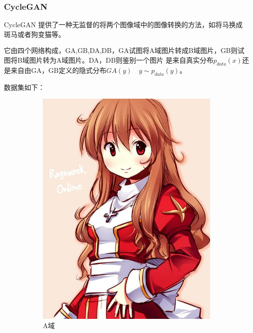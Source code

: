 \documentclass{beamer}
\begin{document}
\begin{frame}
\frametitle{CycleGAN}

CycleGAN \cite{zhu2017unpaired} 提供了一种无监督的将两个图像域中的图像转换的方法，如将马换成斑马或者狗变猫等。

它由四个网络构成，GA,GB,DA,DB，GA试图将A域图片转成B域图片，GB则试图将B域图片转为A域图片。DA，DB则鉴别一个图片
是来自真实分布$p_{data}(x)$还是来自由GA，GB定义的隐式分布$GA(y) \quad y \sim p_{data}(y)$。

数据集如下：

\begin{figure}[htb]
    \centering
    \begin{subfigure}[b]{0.2\linewidth}
        \includegraphics[width=\linewidth]{hp.jpg}
        \caption{A域}
      \end{subfigure}
      \begin{subfigure}[b]{0.2\linewidth}

\end{subfigure}
\end{figure}
\end{frame}
\end{document}
